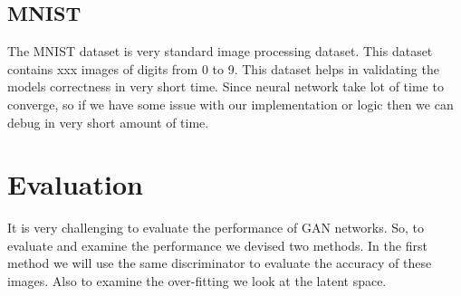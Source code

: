 \subsection{MNIST}
The MNIST dataset is very standard image processing dataset. This dataset contains xxx images of digits from 0 to 9. This dataset helps in validating the models correctness in very short time. Since neural  network take lot of time to converge, so if we have some issue with our implementation or logic then we can debug in very short amount of time.



\section{Evaluation}
It is very challenging to evaluate the performance of GAN networks. So, to evaluate and examine the performance we devised two methods. In the first method we will use the same discriminator to evaluate the accuracy of these images. Also to examine the over-fitting we look at the latent space.







